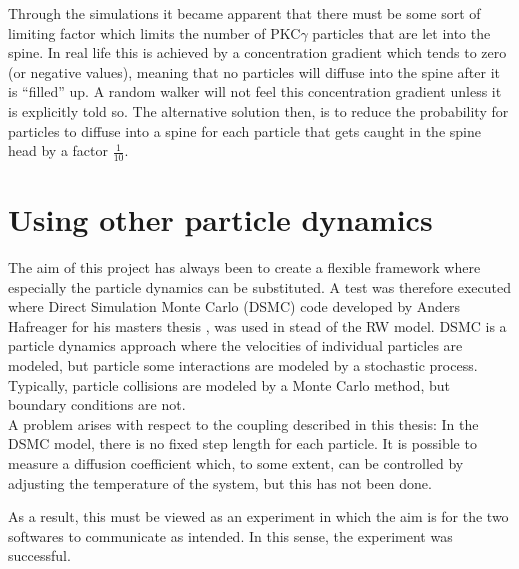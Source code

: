 Through the simulations it became apparent that there must be some sort of limiting factor which limits the number of PKC$\gamma$ particles that are let into the spine. 
In real life this is achieved by a concentration gradient which tends to zero (or negative values), meaning that no particles will diffuse into the spine after it is ``filled'' up. 
A random walker will not feel this concentration gradient unless it is explicitly told so. 
The alternative solution then, is to reduce the probability for particles to diffuse into a spine for each particle that gets caught in the spine head by a factor $\frac{1}{10}$. 

\section{Using other particle dynamics}

The aim of this project has always been to create a flexible framework where especially the particle dynamics can be substituted. 
A test was therefore executed where Direct Simulation Monte Carlo (DSMC) code developed by Anders Hafreager for his masters thesis \cite{hafreager2014flow}, was used in stead of the RW model. 
DSMC is a particle dynamics approach where the velocities of individual particles are modeled, but particle some interactions are modeled by a stochastic process. 
Typically, particle collisions are modeled by a Monte Carlo method, but boundary conditions are not.\\

\noindent A problem arises with respect to the coupling described in this thesis: 
In the DSMC model, there is no fixed step length for each particle. It is possible to measure a diffusion coefficient which, to some extent, can be controlled by adjusting the temperature of the system, but this has not been done. 

As a result, this must be viewed as an experiment in which the aim is for the two softwares to communicate as intended. 
In this sense, the experiment was successful.
